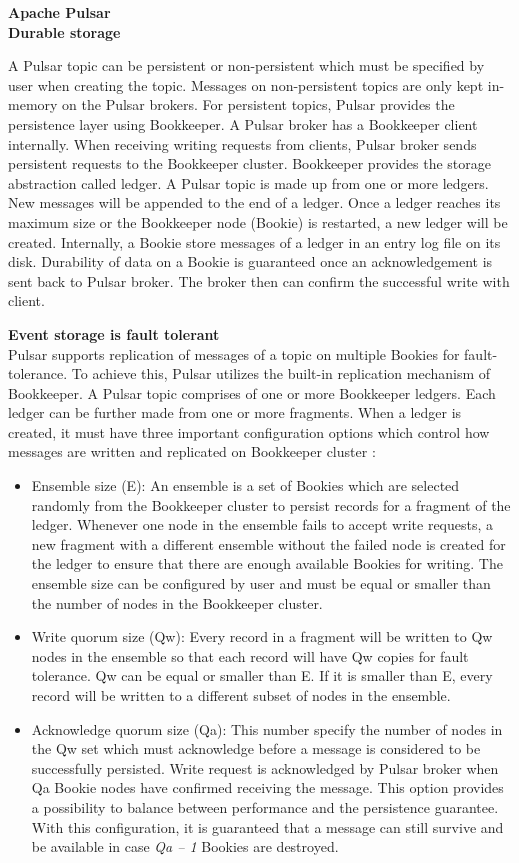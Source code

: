 \large \textbf{Apache Pulsar}\\
\normalsize
\textbf{Durable storage}

A Pulsar topic can be persistent or non-persistent which must be specified by user when creating the topic. Messages on non-persistent topics are only kept in-memory on the Pulsar brokers. For persistent topics, Pulsar provides the persistence layer using Bookkeeper.  A Pulsar broker has a Bookkeeper client internally. When receiving writing requests from clients, Pulsar broker sends persistent requests to the Bookkeeper cluster. Bookkeeper provides the storage abstraction called ledger. A Pulsar topic is made up from one or more ledgers. New messages will be appended to the end of a ledger. Once a ledger reaches its maximum size or the Bookkeeper node (Bookie) is restarted, a new ledger will be created. Internally, a Bookie store messages of a ledger in an entry log file on its disk. Durability of data on a Bookie is guaranteed once an acknowledgement is sent back to Pulsar broker. The broker then can confirm the successful write with client.

\textbf{Event storage is fault tolerant}\\
Pulsar supports replication of messages of a topic on multiple Bookies for fault-tolerance. To achieve this, Pulsar utilizes the built-in replication mechanism of Bookkeeper. A Pulsar topic comprises of one or more Bookkeeper ledgers. Each ledger can be further made from one or more fragments. When a ledger is created, it must have three important configuration options which control how messages are written and replicated on Bookkeeper cluster \cite{bookkeeperprotocol}:
\begin{itemize}
	\item Ensemble size (E): An ensemble is a set of Bookies which are selected randomly from the Bookkeeper cluster to persist records for a fragment of the ledger. Whenever one node in the ensemble fails to accept write requests, a new fragment with a different ensemble without the failed node is created for the ledger to ensure that there are enough available Bookies for writing. The ensemble size can be configured by user and must be equal or smaller than the number of nodes in the Bookkeeper cluster.
	\item Write quorum size (Qw): Every record in a fragment will be written to Qw nodes in the ensemble so that each record will have Qw copies for fault tolerance. Qw can be equal or smaller than E. If it is smaller than E, every record will be written to a different subset of nodes in the ensemble.
	\item Acknowledge quorum size (Qa): This number specify the number of nodes in the Qw set which must acknowledge before a message is considered to be successfully persisted. Write request is acknowledged by Pulsar broker when Qa Bookie nodes have confirmed receiving the message. This option provides a possibility to balance between performance and the persistence guarantee. With this configuration, it is guaranteed that a message can still survive and be available in case \emph{Qa – 1} Bookies are destroyed.
\end{itemize}

